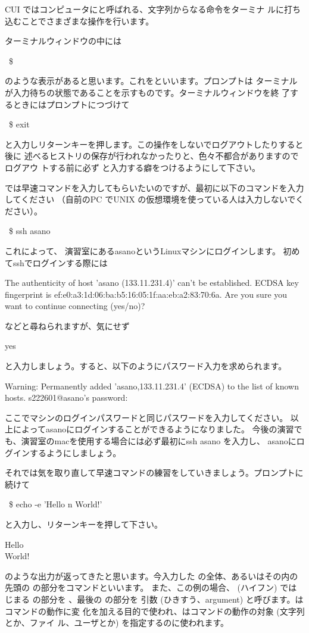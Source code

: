 \documentclass[platex]{jsarticle}
\begin{document}
 CUI ではコンピュータにと呼ばれる、文字列からなる命令をターミナ
 ルに打ち込むことでさまざまな操作を行います。

 ターミナルウィンドウの中には
 \begin{terminal}~\$ \end{terminal}
 のような表示があると思います。これをといいます。プロンプトは
 ターミナルが入力待ちの状態であることを示すものです。ターミナルウィンドウを終
 了するときにはプロンプトにつづけて
 \begin{terminal}~\$ exit\end{terminal}
 と入力しリターンキーを押します。この操作をしないでログアウトしたりすると後に
 述べるヒストリの保存が行われなかったりと、色々不都合がありますのでログアウ
 トする前に必ず  と入力する癖をつけるようにして下さい。

 では早速コマンドを入力してもらいたいのですが、最初に以下のコマンドを入力してください
 （自前のPC でUNIX の仮想環境を使っている人は入力しないでください）。
 \begin{terminal}~\$ ssh asano \end{terminal}
 これによって、
 演習室にあるasanoというLinuxマシンにログインします。
 初めてsshでログインする際には
 \begin{terminal}
The authenticity of host 'asano (133.11.231.4)' can't be established.
ECDSA key fingerprint is ef:e0:a3:1d:06:ba:b5:16:05:1f:aa:eb:a2:83:70:6a.
Are you sure you want to continue connecting (yes/no)? \end{terminal}
 などと尋ねられますが、気にせず
 \begin{terminal} yes \end{terminal}
 と入力しましょう。すると、以下のようにパスワード入力を求められます。
 \begin{terminal} Warning: Permanently added 'asano,133.11.231.4' (ECDSA) to the list of known hosts.
s222601@asano's password: \end{terminal}
ここでマシンのログインパスワードと同じパスワードを入力してください。
以上によってasanoにログインすることができるようになりました。
今後の演習でも、演習室のmacを使用する場合には必ず最初にssh asano を入力し、
asanoにログインするようにしましょう。
 
 それでは気を取り直して早速コマンドの練習をしていきましょう。プロンプトに続けて
 \begin{terminal}~\$ echo -e 'Hello \bs{}n World!'\end{terminal}
 と入力し、リターンキーを押して下さい。
 \begin{terminal}Hello \\ World!\end{terminal}
 のような出力が返ってきたと思います。今入力した
  の全体、あるいはその内の先頭の
  の部分をコマンドといいます。
 また、この例の場合、\term{-} (ハイフン) ではじまる  の部分を
 、最後の  の部分を
 {引数} (ひきすう、argument) と呼びます。はコマンドの動作に変
 化を加える目的で使われ、はコマンドの動作の対象 (文字列とか、ファイ
 ル、ユーザとか) を指定するのに使われます。
 
\end{document}

